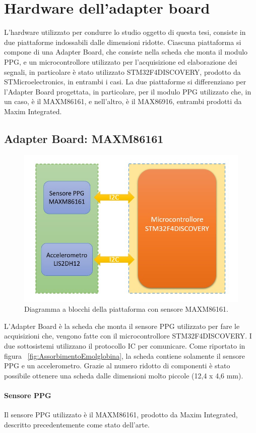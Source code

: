 \section{Hardware dell'adapter board}
L'hardware utilizzato per condurre lo studio oggetto di questa tesi, consiste in due piattaforme indossabili dalle dimensioni ridotte. Ciascuna piattaforma si compone di una Adapter Board, che consiste nella scheda che monta il modulo PPG, e un microcontrollore utilizzato per l'acquisizione ed elaborazione dei segnali, in particolare è stato utilizzato STM32F4DISCOVERY, prodotto da STMicroelectronics, in entrambi i casi.
La due piattaforme si differenziano per l'Adapter Board progettata, in particolare, per il modulo PPG utilizzato che, in un caso, è il MAXM86161, e nell'altro, è il MAX86916, entrambi prodotti da Maxim Integrated.
\subsection{Adapter Board: MAXM86161}
\begin{figure}[h]
	\centering
	\includegraphics[width=0.8\linewidth]{ImageFiles/Hardware/diagramma_blocchi_MAXM}
	\caption{Diagramma a blocchi della piattaforma con sensore MAXM86161.}
	\label{fig:diagramma_blocchi_MAXM}
\end{figure}
L'Adapter Board è la scheda che monta il sensore PPG utilizzato per fare le acquisizioni che, vengono fatte con il microcontrollore STM32F4DISCOVERY. I due sottosistemi utilizzano il protocollo IC per comunicare. Come riportato in figura \Fig~\ref{fig:AssorbimentoEmolglobina}, la scheda contiene solamente il sensore PPG e un accelerometro. Grazie al numero ridotto di componenti è stato possibile ottenere una scheda dalle dimensioni molto piccole (12,4 x 4,6 mm).

\paragraph{Sensore PPG} Il sensore PPG utilizzato è il MAXM86161, prodotto da Maxim Integrated, descritto precedentemente come stato dell'arte.

